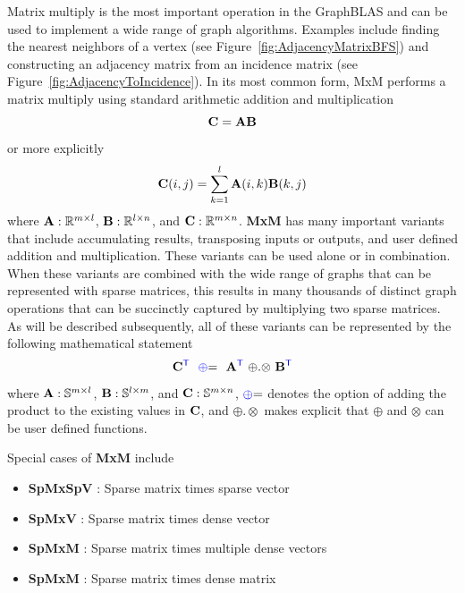 Matrix multiply is the most important operation in the GraphBLAS and can be used to implement a wide range of graph algorithms.  Examples include finding the nearest neighbors of a vertex (see Figure~\ref{fig:AdjacencyMatrixBFS}) and constructing an adjacency matrix from an incidence matrix (see Figure~\ref{fig:AdjacencyToIncidence}). In its most common form, MxM performs a matrix multiply using standard arithmetic addition and multiplication
$$
   {\bf C} = {\bf A} {\bf B}
$$
or more explicitly
$$
   {\bf C}(i,j) = \sum_{k=1}^l {\bf A}(i,k) {\bf B}(k,j)
$$
where ${\bf A}: \mathbb{R}^{m \times l}$,  ${\bf B}: \mathbb{R}^{l \times n}$, and ${\bf C}: \mathbb{R}^{m \times n}$. {\bf MxM} has many important variants that include accumulating results, transposing inputs or outputs, and user defined addition and multiplication.  These variants can be used alone or in combination.  When these variants are combined with the wide range of graphs that can be represented with sparse matrices, this results in many thousands of distinct graph operations that can be succinctly captured by multiplying two sparse matrices.   As will be described subsequently, all of these variants can be represented by the following mathematical statement
$$
   {\bf C}^{\textcolor{blue}{\sf T}} ~~ {\textcolor{blue}{\oplus}}{=} ~~ {\bf A}^{\textcolor{blue}{\sf T}} ~ {\oplus}.{\otimes} ~ {\bf B}^{\textcolor{blue}{\sf T}}
$$
where  ${\bf A}: \mathbb{S}^{m \times l}$,  ${\bf B}: \mathbb{S}^{l \times m}$, and ${\bf C}: \mathbb{S}^{m \times n}$, ${\textcolor{blue}{\oplus}}{=}$ denotes the option of adding the product to the existing values in ${\bf C}$, and ${\oplus}.{\otimes}$ makes explicit that ${\oplus}$ and ${\otimes}$ can be user defined functions.

Special cases of {\bf MxM} include
\begin{itemize}
\item  {\bf SpMxSpV} : Sparse matrix times sparse vector
\item  {\bf SpMxV} : Sparse matrix times dense vector
\item {\bf SpMxM} : Sparse matrix times multiple dense vectors
\item {\bf SpMxM} : Sparse matrix times dense matrix
\end{itemize}

